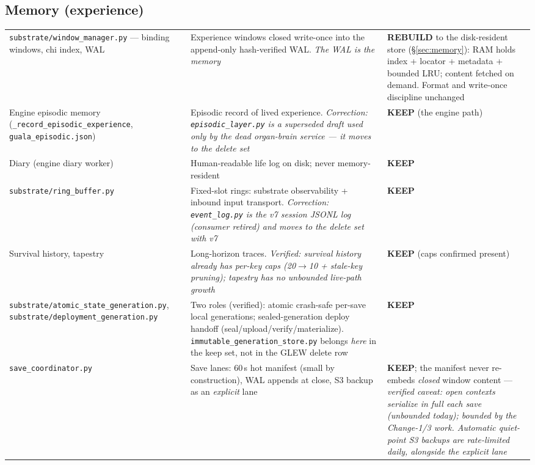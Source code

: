 \documentclass[11pt]{article}
\newcommand{\keep}{\textbf{KEEP}}
\newcommand{\rebuild}{\textbf{REBUILD}}
\begin{document}
\subsection{Memory (experience)}
\begin{longtable}{p{} p{} p{}}
\toprule
\texttt{substrate/window\_manager.py} — binding windows, chi index, WAL &
Experience windows closed write-once into the append-only hash-verified
WAL. \emph{The WAL is the memory} &
\rebuild{} to the disk-resident store (\S\ref{sec:memory}): RAM holds
index + locator + metadata + bounded LRU; content fetched on demand.
Format and write-once discipline unchanged \\
Engine episodic memory (\texttt{\_record\_episodic\_experience},
\texttt{guala\_episodic.json}) &
Episodic record of lived experience. \emph{Correction:
\texttt{episodic\_layer.py} is a superseded draft used only by the dead
organ-brain service — it moves to the delete set} &
\keep{} (the engine path) \\
Diary (engine diary worker) &
Human-readable life log on disk; never memory-resident &
\keep{} \\
\texttt{substrate/ring\_buffer.py} &
Fixed-slot rings: substrate observability + inbound input transport.
\emph{Correction: \texttt{event\_log.py} is the v7 session JSONL log
(consumer retired) and moves to the delete set with v7} &
\keep{} \\
Survival history, tapestry &
Long-horizon traces. \emph{Verified: survival history already has
per-key caps (20$\to$10 + stale-key pruning); tapestry has no unbounded
live-path growth} &
\keep{} (caps confirmed present) \\
\texttt{substrate/atomic\_state\_generation.py},
\texttt{substrate/deployment\_generation.py} &
Two roles (verified): atomic crash-safe per-save local generations;
sealed-generation deploy handoff (seal/upload/verify/materialize).
\texttt{immutable\_generation\_store.py} belongs \emph{here} in the keep
set, not in the GLEW delete row &
\keep{} \\
\texttt{save\_coordinator.py} &
Save lanes: 60\,s hot manifest (small by construction), WAL appends at
close, S3 backup as an \emph{explicit} lane &
\keep{}; the manifest never re-embeds \emph{closed} window content —
\emph{verified caveat: open contexts serialize in full each save
(unbounded today); bounded by the Change-1/3 work. Automatic quiet-point
S3 backups are rate-limited daily, alongside the explicit lane} \\
\bottomrule
\end{longtable}
\end{document}
